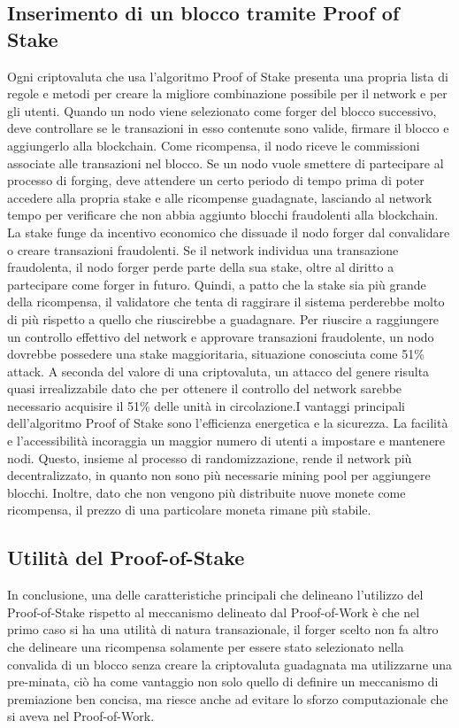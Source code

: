 \subsection{Inserimento di un blocco tramite Proof of Stake}
Ogni criptovaluta che usa l’algoritmo Proof of Stake presenta una propria lista di regole e metodi per creare la migliore combinazione possibile per il network e per gli utenti.
Quando un nodo viene selezionato come forger del blocco successivo, deve controllare se le transazioni in esso contenute sono valide, firmare il blocco e aggiungerlo alla blockchain. Come ricompensa, il nodo riceve le commissioni associate alle transazioni nel blocco.
Se un nodo vuole smettere di partecipare al processo di forging, deve attendere un certo periodo di tempo prima di poter accedere alla propria stake e alle ricompense guadagnate, lasciando al network tempo per verificare che non abbia aggiunto blocchi fraudolenti alla blockchain. La stake funge da incentivo economico che dissuade il nodo forger dal convalidare o creare transazioni fraudolenti. Se il network individua una transazione fraudolenta, il nodo forger perde parte della sua stake, oltre al diritto a partecipare come forger in futuro. Quindi, a patto che la stake sia più grande della ricompensa, il validatore che tenta di raggirare il sistema perderebbe molto di più rispetto a quello che riuscirebbe a guadagnare. Per riuscire a raggiungere un controllo effettivo del network e approvare transazioni fraudolente, un nodo dovrebbe possedere una stake maggioritaria, situazione conosciuta come 51\% attack. A seconda del valore di una criptovaluta, un attacco del genere risulta quasi irrealizzabile dato che per ottenere il controllo del network sarebbe necessario acquisire il 51\% delle unità in circolazione.I vantaggi principali dell’algoritmo Proof of Stake sono l’efficienza energetica e la sicurezza. La facilità e l’accessibilità incoraggia un maggior numero di utenti a impostare e mantenere nodi. Questo, insieme al processo di randomizzazione, rende il network più decentralizzato, in quanto non sono più necessarie mining pool per aggiungere blocchi. Inoltre, dato che non vengono più distribuite nuove monete come ricompensa, il prezzo di una particolare moneta rimane più stabile.
\subsection{Utilità del Proof-of-Stake}
In conclusione, una delle caratteristiche principali che delineano l'utilizzo del Proof-of-Stake rispetto al meccanismo delineato dal Proof-of-Work è che nel primo caso si ha una utilità di natura transazionale, il forger scelto non fa altro che delineare una ricompensa solamente per essere stato selezionato nella convalida di un blocco senza creare la criptovaluta guadagnata ma utilizzarne una pre-minata, ciò ha come vantaggio non solo quello di definire un meccanismo di premiazione ben concisa, ma riesce anche ad evitare lo sforzo computazionale che si aveva nel Proof-of-Work.
\newpage
